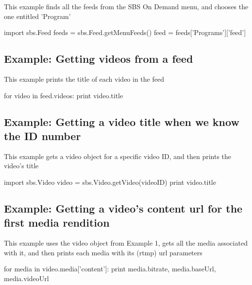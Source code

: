 \-This example finds all the feeds from the \-S\-B\-S \-On \-Demand menu, and chooses the one entitled '\-Program' 
\begin{DoxyCode}
 import sbs.Feed
 feeds = sbs.Feed.getMenuFeeds()
 feed = feeds['Programs']['feed']
\end{DoxyCode}
\hypertarget{index_example_video_feed}{}\subsection{\-Example\-: Getting videos from a feed}\label{index_example_video_feed}
\-This example prints the title of each video in the feed 
\begin{DoxyCode}
 for video in feed.videos:
   print video.title
\end{DoxyCode}
\hypertarget{index_example_video_id}{}\subsection{\-Example\-: Getting a video title when we know the I\-D number}\label{index_example_video_id}
\-This example gets a video object for a specific video \-I\-D, and then prints the video's title 
\begin{DoxyCode}
 import sbs.Video
 video = sbs.Video.getVideo(videoID)
 print video.title
\end{DoxyCode}
 \hypertarget{index_example_media}{}\subsection{\-Example\-: Getting a video's content url for the first media rendition}\label{index_example_media}
\-This example uses the video object from \-Example 1, gets all the media associated with it, and then prints each media with its (rtmp) url parameters 
\begin{DoxyCode}
 for media in video.media['content']:
   print media.bitrate, media.baseUrl, media.videoUrl
\end{DoxyCode}
 